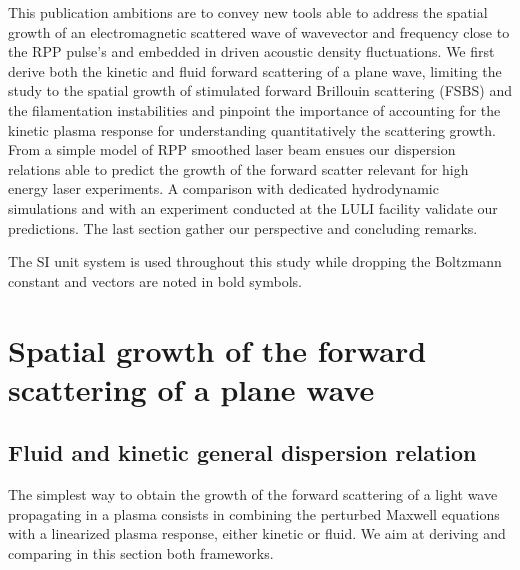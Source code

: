 \documentclass[
 reprint,
 superscriptaddress,
 amsmath,amssymb,
 aps,
]{revtex4-1}
\begin{document}
This publication ambitions are to convey new tools 
able to address  the spatial growth of an electromagnetic scattered wave of wavevector and frequency close to the RPP pulse's and embedded in driven acoustic density fluctuations.
We first derive both the kinetic and fluid forward scattering of a plane wave, limiting the study to the spatial  growth of  stimulated forward Brillouin scattering (FSBS) and the filamentation instabilities and pinpoint the importance of accounting for the kinetic plasma response for understanding quantitatively the scattering growth.
From  a simple model of RPP smoothed laser beam ensues our dispersion relations  able to predict the growth of the forward scatter relevant for high energy laser experiments. 
A comparison with dedicated hydrodynamic simulations and with an experiment conducted at the LULI facility validate our predictions.
The last section gather our perspective and concluding remarks. 

The SI unit system is used throughout this study while dropping the Boltzmann constant and vectors are noted in bold symbols. 

\section{Spatial growth of the  forward scattering of a plane wave}\label{sec:plane}
\subsection{Fluid and kinetic general dispersion relation}
The simplest way to obtain the growth of the forward scattering of a light wave propagating in a plasma consists  in combining the perturbed Maxwell equations with a linearized plasma response, either kinetic or fluid.
We aim at deriving and comparing in this section both frameworks.
\end{document}
